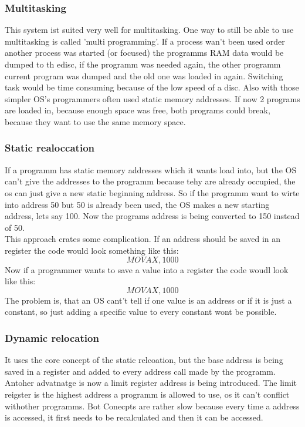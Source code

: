 \documentclass[a4paper]{scrartcl}
\begin{document}
                \subsubsection{Multitasking}
                    This system ist suited very well for multitasking. One way to still be able to use multitasking is called 'multi programming'. If a process wan't been used order
                    another process was started (or focused) the programms RAM data would be dumped to th edisc, if the programm was needed again, the other programm current 
                    program was dumped and the old one was loaded in again. Switching task would be time consuming because of the low speed of a disc. Also with those simpler OS's
                    programmers often used static memory addresses. If now 2 programs are loaded in, because enough space was free, both programs could break, because they want to use the same 
                    memory space.
                \subsubsection{Static realoccation}
                    If a programm has static memory addresses which it wants load into, but the OS can't give the addresses to the programm because tehy are already occupied,
                    the os can just give a new static beginning address. So if the programm want to wirte into address 50 but 50 is already been used, the OS makes a new
                    starting address, lets say 100. Now the programs address is being converted to 150 instead of 50. \\
                    This approach crates some complication. If an address should be saved in an register the code would look something like this: 
                    \begin{equation*}
                        MOV AX,1000
                    \end{equation*}
                    Now if a programmer wants to save a value into a register the code woudl look like this: 
                    \begin{equation*}
                        MOV AX,1000
                    \end{equation*}
                    The problem is, that an OS cant't tell if one value is an address or if it is just a constant, so just adding a specific value to every constant wont be possible.
                \subsubsection{Dynamic relocation}
                    It uses the core concept of the static relcoation, but the base address is being saved in a register and added to every address call made by the programm.
                    Antoher advatnatge is now a limit register address is being introduced. The limit reigster is the highest address a programm is allowed to use, os it can't conflict withother programms.
                    Bot Conecpts are rather slow because every time a address is accessed, it first needs to be recalculated and then it can be accessed. 
\end{document}
